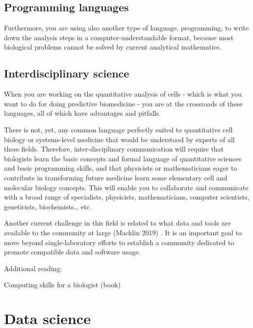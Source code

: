 \documentclass[
]{book}
\begin{document}
\hypertarget{programming-languages}{%
\section{Programming languages}\label{programming-languages}}

Furthermore, you are using also another type of language, programming, to write down the analysis steps in a computer-understandable format, because most biological problems cannot be solved by current analytical mathematics.

\hypertarget{interdisciplinary-science}{%
\section{Interdisciplinary science}\label{interdisciplinary-science}}

When you are working on the quantitative analysis of cells - which is what you want to do for doing predictive biomedicine - you are at the crossroads of these languages, all of which have advantages and pitfalls.

There is not, yet, any common language perfectly suited to quantitative cell biology or systems-level medicine that would be understood by experts of all these fields. Therefore, inter-disciplinary communication will require that biologists learn the basic concepts and formal language of quantitative sciences and basic programming skills, and that physicists or mathematicians eager to contribute in transforming future medicine learn some elementary cell and molecular biology concepts. This will enable you to collaborate and communicate with a broad range of specialists, physicists, mathematicians, computer scientists, geneticists, biochemists\ldots{} etc.

Another current challenge in this field is related to what data and tools are available to the community at large (Macklin 2019) . It is an important goal to move beyond single-laboratory efforts to establish a community dedicated to promote compatible data and software usage.

Additional reading:

Computing skills for a biologist (book)

\hypertarget{data-science}{%
\chapter{Data science}\label{data-science}}
\end{document}
